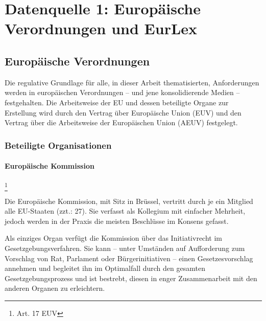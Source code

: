 \chapter{Datenquelle 1: Europäische Verordnungen und EurLex}




    \section{Europäische Verordnungen}


    Die regulative Grundlage für alle, in dieser Arbeit thematisierten, Anforderungen werden in europäischen Verordnungen -- und jene konsolidierende Medien -- festgehalten.
    Die Arbeitsweise der EU und dessen beteiligte Organe zur Erstellung  wird durch den Vertrag über Europäische Union (EUV) und den Vertrag über die Arbeitsweise der Europäischen Union (AEUV) festgelegt.
    
        
        
        \subsection{Beteiligte Organisationen}


\subsubsection{Europäische Kommission}\footnote{Art. 17 EUV} 

Die Europäische Kommission, mit Sitz in Brüssel, vertritt durch je ein Mitglied alle EU-Staaten (zzt.: 27). Sie verfasst als Kollegium mit einfacher Mehrheit, jedoch werden in der Praxis die meisten Beschlüsse im Konsens gefasst. 

Als einziges Organ verfügt die Kommission über das Initiativrecht im Gesetzgebungsverfahren. Sie kann – unter Umständen auf Aufforderung zum Vorschlag von Rat, Parlament oder Bürgerinitiativen – einen Gesetzesvorschlag annehmen und begleitet ihn im Optimalfall durch den gesamten Gesetzgebungsprozess und ist bestrebt, diesen in enger Zusammenarbeit mit den anderen Organen zu erleichtern.

